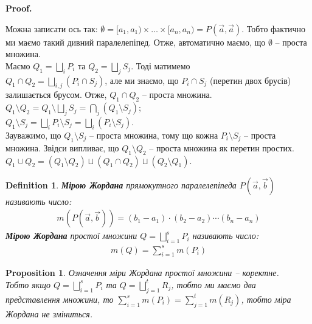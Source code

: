 \documentclass[a4paper, 10pt]{article}
\makeatletter
\def\huge{\displaystyle}
\def\qed{$\blacksquare$}
\theoremstyle{theoremdd}
\theoremstyle{theoremdd}
\newtheorem{definition}[theorem]{Definition}
\theoremstyle{theoremdd}
\theoremstyle{theoremdd}
\theoremstyle{theoremdd}
\theoremstyle{theoremdd}
\theoremstyle{theoremdd}
\theoremstyle{theoremdd}
\theoremstyle{theoremdd}
\newtheorem{proposition}[theorem]{Proposition}
\theoremstyle{theoremdd}
\theoremstyle{theoremdd}
\theoremstyle{theoremdd}
\theoremstyle{theoremdd}
\theoremstyle{theoremdd}
\theoremstyle{theoremdd}
\renewenvironment{proof}[1][Proof.\\]{\par
\pushQED{\hfill \qed}%
\normalfont \topsep6\p@\@plus6\p@\relax
\trivlist
\item\relax
{\bfseries
#1\@addpunct{.}}\hspace\labelsep\ignorespaces
}{%
\popQED\endtrivlist\@endpefalse
}
\makeatother
\begin{document}
\begin{proof}
Можна записати ось так: $\emptyset = [a_1,a_1) \times \dots \times [a_n,a_n) = P(\vec{a},\vec{a})$. Тобто фактично ми маємо такий дивний паралелепіпед. Отже, автоматично маємо, що $\emptyset$ -- проста множина.
\bigskip \\
Маємо $Q_1 = \displaystyle\bigsqcup_i P_i$ та $Q_2 = \displaystyle\bigsqcup_j S_j$. Тоді матимемо\\
$Q_1 \cap Q_2 = \displaystyle\bigsqcup_{i,j} (P_i \cap S_j)$, але ми знаємо, що $P_i \cap S_j$ (перетин двох брусів) залишається брусом. Отже, $Q_1 \cap Q_2$ -- проста множина.
\bigskip \\
$\displaystyle Q_1 \setminus Q_2 = Q_1 \setminus \bigsqcup_j S_j = \bigcap_j (Q_1 \setminus S_j)$;\\
$Q_1 \setminus S_j = \displaystyle\bigsqcup_i P_i \setminus S_j = \bigsqcup_i (P_i \setminus S_j)$.\\
Зауважимо, що $Q_1 \setminus S_j$ -- проста множина, тому що кожна $P_i \setminus S_j$ -- проста множина. Звідси випливає, що $Q_1 \setminus Q_2$ -- проста множина як перетин простих.
\bigskip \\
$Q_1 \cup Q_2 = (Q_1 \setminus Q_2) \sqcup (Q_1 \cap Q_2) \sqcup (Q_2 \setminus Q_1)$.
\end{proof}

\begin{definition}
\textbf{Мірою Жордана} прямокутного паралелепіпеда $P(\vec{a},\vec{b})$ називають число:
\begin{align*}
m (P(\vec{a},\vec{b})) = (b_1-a_1)\cdot (b_2-a_2) \cdots (b_n-a_n)
\end{align*}
\textbf{Мірою Жордана} простої множини $Q = \huge\bigsqcup_{i=1}^s P_i$ називають число:
\begin{align*}
m(Q) = \huge\sum_{i=1}^s m (P_i)
\end{align*}
\end{definition}

\begin{proposition}
Означення міри Жордана простої множини -- коректне.\\
Тобто якщо $Q = \huge\bigsqcup_{i=1}^s P_i$ та $Q = \huge\bigsqcup_{j=1}^t R_j$, тобто ми маємо два представлення множини, то $\huge\sum_{i=1}^s m (P_i) = \huge\sum_{j=1}^t m (R_j)$, тобто міра Жордана не зміниться.
\end{proposition}
\end{document}
